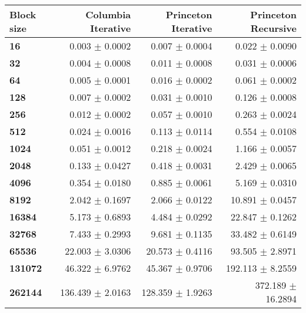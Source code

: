 \begin{tabular}{lrrr}\toprule
\textbf{Block size}  & \textbf{Columbia Iterative} & \textbf{Princeton Iterative} & \textbf{Princeton Recursive} \\\midrule
\textbf{16}     & 0.003 $\pm$ 0.0002 & 0.007 $\pm$ 0.0004 & 0.022 $\pm$ 0.0090        \\
\textbf{32}     & 0.004 $\pm$ 0.0008 & 0.011 $\pm$ 0.0008 & 0.031 $\pm$ 0.0006        \\
\textbf{64}     & 0.005 $\pm$ 0.0001 & 0.016 $\pm$ 0.0002 & 0.061 $\pm$ 0.0002        \\
\textbf{128}    & 0.007 $\pm$ 0.0002 & 0.031 $\pm$ 0.0010 & 0.126 $\pm$ 0.0008        \\
\textbf{256}    & 0.012 $\pm$ 0.0002 & 0.057 $\pm$ 0.0010 & 0.263 $\pm$ 0.0024        \\
\textbf{512}    & 0.024 $\pm$ 0.0016 & 0.113 $\pm$ 0.0114 & 0.554 $\pm$ 0.0108        \\
\textbf{1024}   & 0.051 $\pm$ 0.0012 & 0.218 $\pm$ 0.0024 & 1.166 $\pm$ 0.0057        \\
\textbf{2048}   & 0.133 $\pm$ 0.0427 & 0.418 $\pm$ 0.0031 & 2.429 $\pm$ 0.0065        \\
\textbf{4096}   & 0.354 $\pm$ 0.0180 & 0.885 $\pm$ 0.0061 & 5.169 $\pm$ 0.0310        \\
\textbf{8192}   & 2.042 $\pm$ 0.1697 & 2.066 $\pm$ 0.0122 & 10.891 $\pm$ 0.0457       \\
\textbf{16384}  & 5.173 $\pm$ 0.6893 & 4.484 $\pm$ 0.0292 & 22.847 $\pm$ 0.1262       \\
\textbf{32768}  & 7.433 $\pm$ 0.2993 & 9.681 $\pm$ 0.1135 & 33.482 $\pm$ 0.6149       \\
\textbf{65536}  & 22.003 $\pm$ 3.0306 & 20.573 $\pm$ 0.4116 & 93.505 $\pm$ 2.8971     \\
\textbf{131072} & 46.322 $\pm$ 6.9762 & 45.367 $\pm$ 0.9706 & 192.113 $\pm$ 8.2559    \\
\textbf{262144} & 136.439 $\pm$ 2.0163 & 128.359 $\pm$ 1.9263 & 372.189 $\pm$ 16.2894 \\
\bottomrule
\end{tabular}
